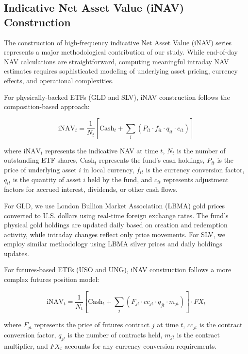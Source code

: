 \subsection{Indicative Net Asset Value (iNAV) Construction}

The construction of high-frequency indicative Net Asset Value (iNAV) series represents a major methodological contribution of our study. While end-of-day NAV calculations are straightforward, computing meaningful intraday NAV estimates requires sophisticated modeling of underlying asset pricing, currency effects, and operational complexities.

For physically-backed ETFs (GLD and SLV), iNAV construction follows the composition-based approach:

\begin{equation}
\text{iNAV}_{t} = \frac{1}{N_t} \left[ \text{Cash}_t + \sum_{i} \left( P_{it} \cdot f_{it} \cdot q_{it} \cdot c_{it} \right) \right]
\end{equation}

where $\text{iNAV}_t$ represents the indicative NAV at time $t$, $N_t$ is the number of outstanding ETF shares, $\text{Cash}_t$ represents the fund's cash holdings, $P_{it}$ is the price of underlying asset $i$ in local currency, $f_{it}$ is the currency conversion factor, $q_{it}$ is the quantity of asset $i$ held by the fund, and $c_{it}$ represents adjustment factors for accrued interest, dividends, or other cash flows.

For GLD, we use London Bullion Market Association (LBMA) gold prices converted to U.S. dollars using real-time foreign exchange rates. The fund's physical gold holdings are updated daily based on creation and redemption activity, while intraday changes reflect only price movements. For SLV, we employ similar methodology using LBMA silver prices and daily holdings updates.

For futures-based ETFs (USO and UNG), iNAV construction follows a more complex futures position model:

\begin{equation}
\text{iNAV}_{t} = \frac{1}{N_t} \left[ \text{Cash}_t + \sum_{j} \left( F_{jt} \cdot cc_{jt} \cdot q_{jt} \cdot m_{jt} \right) \right] \cdot FX_t
\end{equation}

where $F_{jt}$ represents the price of futures contract $j$ at time $t$, $cc_{jt}$ is the contract conversion factor, $q_{jt}$ is the number of contracts held, $m_{jt}$ is the contract multiplier, and $FX_t$ accounts for any currency conversion requirements.

